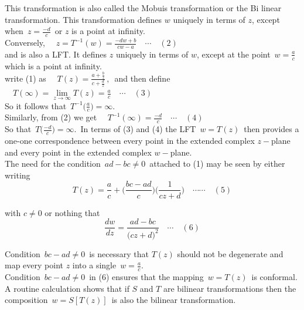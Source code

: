 \documentclass[11pt,a4paper]{article}
\theoremstyle{definition}
\begin{document}
This transformation is also called the Mobuis transformation or the Bi linear transformation. This transformation defines $w$ uniquely in terms of $z$, except when $\, z = \frac{-d}{c}\,$ or $z$ is a point at infinity.\\

Conversely, $\quad  z = T^{-1}(w) = \frac{-dw + b}{cw - a}\quad  \cdots\quad  (2)$\\

and is also a LFT. It defines $z$ uniquely in terms of $w$, except at the point $\, w = \frac{a}{c}\,$ which is a point at infinity.\\

write (1) as $\quad  T(z)  = \frac{a + \frac{b}{z}}{c + \frac{d}{z}}\,, \,$ and then define $\quad  T(\infty) = \lim\limits_{z \rightarrow \infty} T(z) = \frac{a}{c}\quad  \cdots \quad  (3)$\\

So it follows that $\, T^{-1}\Big(\frac{a}{c}\Big) = \infty$.\\

Similarly, from (2) we get $\quad  T^{-1}(\infty) = \frac{-d}{c} \quad  \cdots\quad  (4)$\\

So that $\, T\Big(\frac{-d}{c}\Big) = \infty.\,$ In terms of (3) and (4) the LFT $\, w = T(z)\,$ then provides a one-one correspondence between every point in the extended complex $z-$plane and every point in the extended complex $w-$plane.\\
The need for the condition $\, ad - bc \neq 0\,$ attached to (1) may be seen by either writing 
$$\boxed{T(z) = \frac{a}{c}  + \Big( \frac{bc - ad}{c}\Big) \Big(\frac{1}{cz + d}\Big)\quad \cdots \cdots \quad  (5)}$$

with $c\neq 0$ or nothing that 
$$\boxed{\frac{dw}{dz} = \frac{ad - bc}{\big(cz + d\big)^2}\quad \cdots\quad  (6)}$$

Condition $\, bc - ad\neq 0\,$ is necessary that $T(z)$ should not be degenerate and map every point $z$ into a single $\, w =\frac{a}{c}$.\\

Condition $\, bc - ad\neq 0 \, $ in (6) ensures that the mapping $\, w = T(z)\,$ is conformal.\\

A routine calculation shows that if $S$ and $T$ are bilinear transformations then the composition $\, w = S[T(z)]\,$ is also the bilinear transformation.\\\\
\end{document}
